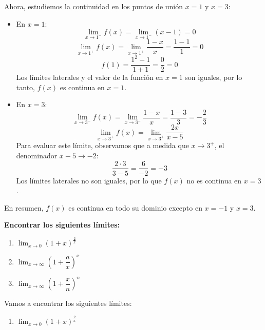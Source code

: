 \documentclass[answers]{exam} %
\begin{document}
\begin{questions}
\begin{solution}
        Ahora, estudiemos la continuidad en los puntos de unión \( x = 1 \) y \( x = 3 \):
        
        \begin{itemize}
            \item En \( x = 1 \):
                \[
                \lim_{x \to 1^-} f(x) = \lim_{x \to 1^-} (x - 1) = 0
                \]
                \[
                \lim_{x \to 1^+} f(x) = \lim_{x \to 1^+} \frac{1 - x}{x} = \frac{1 - 1}{1} = 0
                \]
                \[
                f(1) = \frac{1^2 - 1}{1 + 1} = \frac{0}{2} = 0
                \]
                Los límites laterales y el valor de la función en \( x = 1 \) son iguales, por lo tanto, \( f(x) \) es continua en \( x = 1 \).
                
            \item En \( x = 3 \):
                \[
                \lim_{x \to 3^-} f(x) = \lim_{x \to 3^-} \frac{1 - x}{x} = \frac{1 - 3}{3} = -\frac{2}{3}
                \]
                \[
                \lim_{x \to 3^+} f(x) = \lim_{x \to 3^+} \frac{2x}{x - 5}
                \]
                Para evaluar este límite, observamos que a medida que \( x \to 3^+ \), el denominador \( x - 5 \to -2 \):
                \[
                \frac{2 \cdot 3}{3 - 5} = \frac{6}{-2} = -3
                \]
                Los límites laterales no son iguales, por lo que \( f(x) \) no es continua en \( x = 3 \).
        \end{itemize}
        
        En resumen, \( f(x) \) es continua en todo su dominio excepto en \( x = -1 \) y \( x = 3 \).
    \end{solution}
    

    \vspace{0.5cm}
    \question \large\textbf{Encontrar los siguientes límites:}
    \begin{enumerate}[label=\alph*.]
		\item $\displaystyle \lim_{x\to{0}} (1+x)^{\frac{2}{x}}$
		\item $\displaystyle \lim_{x\to{\infty}} (1+\dfrac{a}{x})^{x}$
		\item $\displaystyle \lim_{x\to{\infty}} (1+\dfrac{x}{n})^{n}$
		
	\end{enumerate}
    \begin{solution}
        Vamos a encontrar los siguientes límites:
    
        \begin{enumerate}[label=\alph*.]
            \item \(\displaystyle \lim_{x\to{0}} (1+x)^{\frac{2}{x}}\)
    

\end{enumerate}
\end{solution}
\end{questions}
\end{document}
